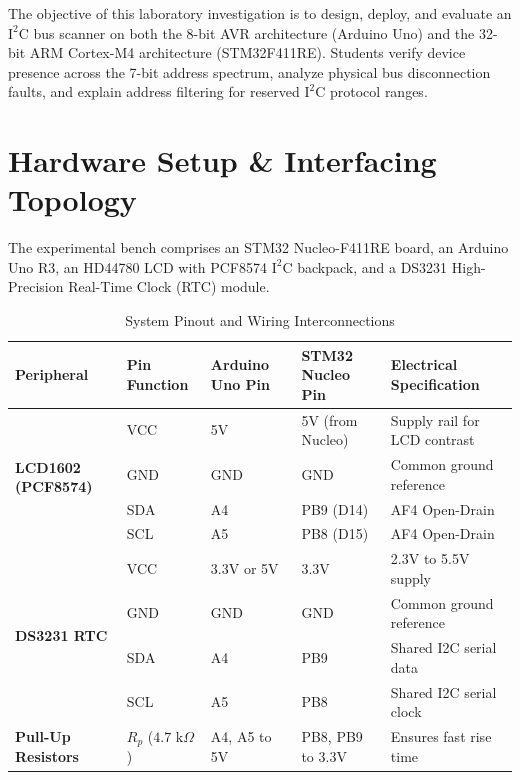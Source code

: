 \documentclass[11pt,a4paper]{article}
\begin{document}

\begin{objectivebox}
The objective of this laboratory investigation is to design, deploy, and evaluate an $\text{I}^2\text{C}$ bus scanner on both the 8-bit AVR architecture (Arduino Uno) and the 32-bit ARM Cortex-M4 architecture (STM32F411RE). Students verify device presence across the 7-bit address spectrum, analyze physical bus disconnection faults, and explain address filtering for reserved $\text{I}^2\text{C}$ protocol ranges.
\end{objectivebox}

\section{Hardware Setup \& Interfacing Topology}
The experimental bench comprises an STM32 Nucleo-F411RE board, an Arduino Uno R3, an HD44780 LCD with PCF8574 $\text{I}^2\text{C}$ backpack, and a DS3231 High-Precision Real-Time Clock (RTC) module.

\begin{table}[h!]
\centering
\footnotesize
\caption{System Pinout and Wiring Interconnections}
\vspace{4pt}
\begin{tabularx}{\textwidth}{p{2.6cm} p{2.0cm} p{2.2cm} p{2.6cm} X}
\toprule
\textbf{Peripheral} & \textbf{Pin Function} & \textbf{Arduino Uno Pin} & \textbf{STM32 Nucleo Pin} & \textbf{Electrical Specification} \\
\midrule
\multirow{4}{*}{\textbf{LCD1602 (PCF8574)}} 
    & VCC & 5V & 5V (from Nucleo) & Supply rail for LCD contrast \\
    & GND & GND & GND & Common ground reference \\
    & SDA & A4 & PB9 (D14) & AF4 Open-Drain \\
    & SCL & A5 & PB8 (D15) & AF4 Open-Drain \\
\midrule
\multirow{4}{*}{\textbf{DS3231 RTC}} 
    & VCC & 3.3V or 5V & 3.3V & 2.3V to 5.5V supply \\
    & GND & GND & GND & Common ground reference \\
    & SDA & A4 & PB9 & Shared I2C serial data \\
    & SCL & A5 & PB8 & Shared I2C serial clock \\
\midrule
\textbf{Pull-Up Resistors} & $R_p$ ($4.7\text{ k}\Omega$) & A4, A5 to 5V & PB8, PB9 to 3.3V & Ensures fast rise time \\
\bottomrule
\end{tabularx}
\end{table}
\end{document}
